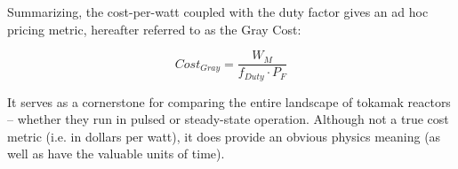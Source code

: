 \documentclass[11pt]{book}
\begin{document}
Summarizing, the cost-per-watt coupled with the duty factor gives an ad hoc pricing metric, hereafter referred to as the Gray Cost:

\begin{equation}
	Cost_{Gray} = \frac{W_M}{f_{Duty} \cdot P_F}
\end{equation}

It serves as a cornerstone for comparing the entire landscape of tokamak reactors -- whether they run in pulsed or steady-state operation. Although not a true cost metric (i.e. in dollars per watt), it does provide an obvious physics meaning (as well as have the valuable units of time).
\end{document}
